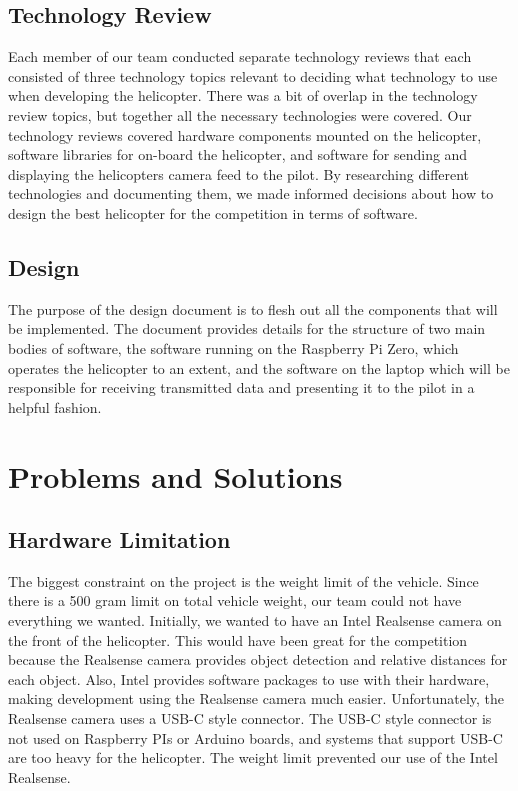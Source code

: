 \documentclass[onecolumn, oneside, letterpaper, draftclsnofoot, 10pt, compsoc]{IEEEtran}
\begin{document}
\subsection{Technology Review}
\noindent
Each member of our team conducted separate technology reviews that each consisted of three technology topics relevant to deciding what technology to use when developing the helicopter. There was a bit of overlap in the technology review topics, but together all the necessary technologies were covered. Our technology reviews covered hardware components mounted on the helicopter, software libraries for on-board the helicopter, and software for sending and displaying the helicopters camera feed to the pilot. By researching different technologies and documenting them, we made informed decisions about how to design the best helicopter for the competition in terms of software.
\subsection{Design}
The purpose of the design document is to flesh out all the components that will be implemented. The document provides details for the structure of two main bodies of software, the software running on the Raspberry Pi Zero, which operates the helicopter to an extent, and the software on the laptop which will be responsible for receiving transmitted data and presenting it to the pilot in a helpful fashion.
\noindent

\section{Problems and Solutions}
\subsection{Hardware Limitation}
The biggest constraint on the project is the weight limit of the vehicle. Since there is a 500 gram limit on total vehicle weight, our team could not have everything we wanted. Initially, we wanted to have an Intel Realsense camera on the front of the helicopter. This would have been great for the competition because the Realsense camera provides object detection and relative distances for each object. Also, Intel provides software packages to use with their hardware, making development using the Realsense camera much easier. Unfortunately, the Realsense camera uses a USB-C style connector. The USB-C style connector is not used on Raspberry PIs or Arduino boards, and systems that support USB-C are too heavy for the helicopter. The weight limit prevented our use of the Intel Realsense.
\end{document}
